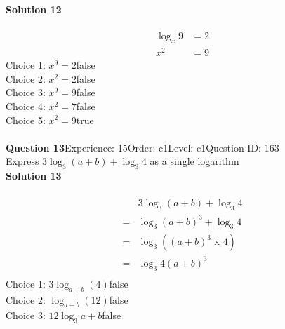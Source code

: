 \documentclass{article}
\begin{document}
\noindent\textbf{Solution 12}\\[2pt]
\\[-35pt]\begin{align*}
\log_x9&=2\\[2pt]
x^2&=9
\end{align*}
Choice 1: \hspace{20pt}$x^9=2$\hspace{20pt}false\\
Choice 2: \hspace{20pt}$x^2=2$\hspace{20pt}false\\
Choice 3: \hspace{20pt}$x^9=9$\hspace{20pt}false\\
Choice 4: \hspace{20pt}$x^2=7$\hspace{20pt}false\\
Choice 5: \hspace{20pt}$x^2=9$\hspace{20pt}true\\
\\[4pt]
\noindent\textbf{Question 13}\hspace{20pt}Experience: 15\hspace{20pt}Order: c1\hspace{20pt}Level: c1\hspace{20pt}Question-ID: 163\\[2pt]
Express $3\log_{3}(a+b)+\log_{3}4$ as a single logarithm\\[4pt]
\noindent\textbf{Solution 13}\\[2pt]
\\[-35pt]\begin{align*}
&3\log_{3}(a+b)+\log_{3}4\\[2pt]
=&\log_{3}(a+b)^3+\log_{3}4\\[2pt]
=&\log_{3}((a+b)^3 \,\, \text{x} \,\, 4)\\[2pt]
=&\log_{3}4(a+b)^3\\[-80pt]
\end{align*}
Choice 1: \hspace{20pt}$3\log_{a+b}(4)$\hspace{20pt}false\\
Choice 2: \hspace{20pt}$\log_{a+b}(12)$\hspace{20pt}false\\
Choice 3: \hspace{20pt}$12\log_{3}a+b$\hspace{20pt}false\\
\end{document}
